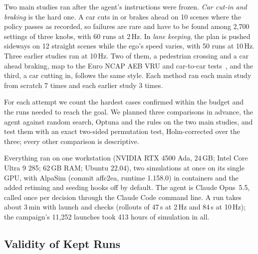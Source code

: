 \documentclass[conference]{IEEEtran}
\newcommand{\guide}[1]{}
\begin{document}
Two main studies ran after the agent's instructions were frozen. \emph{Car cut-in and braking} is the hard one. A car cuts in or brakes ahead on 10 scenes where the policy passes as recorded, so failures are rare and have to be found among 2,700 settings of three knobs, with 60 runs at 2\,Hz. In \emph{lane keeping}, the plan is pushed sideways on 12 straight scenes while the ego's speed varies, with 50 runs at 10\,Hz. Three earlier studies ran at 10\,Hz. Two of them, a pedestrian crossing and a car ahead braking, map to the Euro NCAP AEB VRU and car-to-car tests~\cite{euroncap2023vru,euroncap2023c2c}, and the third, a car cutting in, follows the same style. Each method ran each main study from scratch 7 times and each earlier study 3 times.

For each attempt we count the hardest cases confirmed within the budget and the runs needed to reach the goal. We planned three comparisons in advance, the agent against random search, Optuna and the rules on the two main studies, and test them with an exact two-sided permutation test, Holm-corrected over the three; every other comparison is descriptive.

Everything ran on one workstation (NVIDIA RTX 4500 Ada, 24\,GB; Intel Core Ultra 9 285; 62\,GB RAM; Ubuntu 22.04), two simulations at once on its single GPU, with AlpaSim (commit affc2ea, runtime 1.158.0) in containers and the added retiming and seeding hooks off by default. The agent is Claude Opus~5.5, called once per decision through the Claude Code command line. A run takes about 3\,min with launch and checks (rollouts of 47\,s at 2\,Hz and 84\,s at 10\,Hz); the campaign's 11,252 launches took 413 hours of simulation in all.

\subsection{Validity of Kept Runs}\label{sec:validity}
\guide{Test whether every kept run is real data, in both directions: bad runs must be caught and good runs kept. (1) Planted faults: in three campaigns, runs were broken on purpose in ways that still end normally (deleted or corrupted results, a requested setting silently dropped, the recorded human driving the whole run, no controller in the loop). Count the invalid runs kept with no gate, with the per-run gate, and with the batch audit added, and give an upper bound on the share that could still slip through. Say which faults only the batch audit catches and why (they look the same in every run of a batch). (2) False alarms: the physics check on clean runs (none should be thrown away) and on runs with silent motion faults (all should be caught). (3) Close by noting that every later result uses kept runs only. \emph{Add a small table, generated from the data: invalid runs kept per planted-fault campaign with no gate, the per-run gate, and gate + audit. No figure is needed.}}
\end{document}
